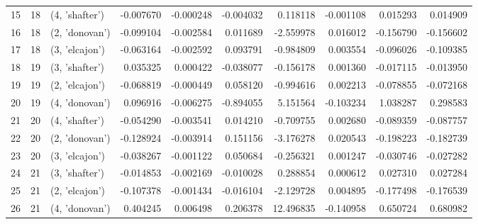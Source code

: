 \begin{tabular}{lrlrrrrrrr}
15 &     18 &  (4, 'shafter') & -0.007670 & -0.000248 & -0.004032 &   0.118118 & -0.001108 &  0.015293 &  0.014909 \\
16 &     18 &  (2, 'donovan') & -0.099104 & -0.002584 &  0.011689 &  -2.559978 &  0.016012 & -0.156790 & -0.156602 \\
17 &     18 &  (3, 'elcajon') & -0.063164 & -0.002592 &  0.093791 &  -0.984809 &  0.003554 & -0.096026 & -0.109385 \\
18 &     19 &  (3, 'shafter') &  0.035325 &  0.000422 & -0.038077 &  -0.156178 &  0.001360 & -0.017115 & -0.013950 \\
19 &     19 &  (2, 'elcajon') & -0.068819 & -0.000449 &  0.058120 &  -0.994616 &  0.002213 & -0.078855 & -0.072168 \\
20 &     19 &  (4, 'donovan') &  0.096916 & -0.006275 & -0.894055 &   5.151564 & -0.103234 &  1.038287 &  0.298583 \\
21 &     20 &  (4, 'shafter') & -0.054290 & -0.003541 &  0.014210 &  -0.709755 &  0.002680 & -0.089359 & -0.087757 \\
22 &     20 &  (2, 'donovan') & -0.128924 & -0.003914 &  0.151156 &  -3.176278 &  0.020543 & -0.198223 & -0.182739 \\
23 &     20 &  (3, 'elcajon') & -0.038267 & -0.001122 &  0.050684 &  -0.256321 &  0.001247 & -0.030746 & -0.027282 \\
24 &     21 &  (3, 'shafter') & -0.014853 & -0.002169 & -0.010028 &   0.288854 &  0.000612 &  0.027310 &  0.027284 \\
25 &     21 &  (2, 'elcajon') & -0.107378 & -0.001434 & -0.016104 &  -2.129728 &  0.004895 & -0.177498 & -0.176539 \\
26 &     21 &  (4, 'donovan') &  0.404245 &  0.006498 &  0.206378 &  12.496835 & -0.140958 &  0.650724 &  0.680982 \\
\bottomrule
\end{tabular}
